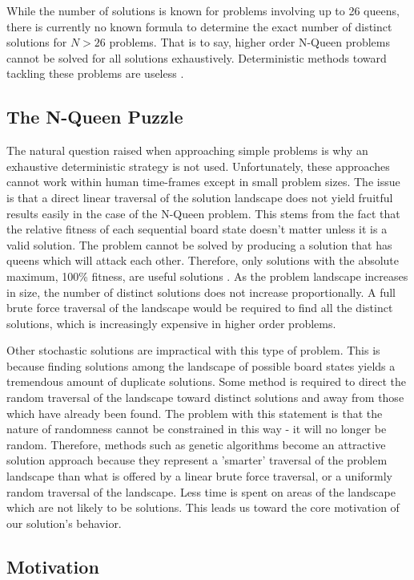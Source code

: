 \documentclass[conference]{IEEEtran}
\begin{document}
While the number of solutions is known for problems involving up to 26 queens, there is currently no known formula to determine the exact number of distinct solutions for {$N>26$} problems. That is to say, higher order N-Queen problems cannot be solved for all solutions exhaustively. Deterministic methods toward tackling these problems are useless \cite{crawford1992solving}.

\subsection{The N-Queen Puzzle}
The natural question raised when approaching simple problems is why an exhaustive deterministic strategy is not used. Unfortunately, these approaches cannot work within human time-frames except in small problem sizes. The issue is that a direct linear traversal of the solution landscape does not yield fruitful results easily in the case of the N-Queen problem. This stems from the fact that the relative fitness of each sequential board state doesn't matter unless it is a valid solution. The problem cannot be solved by producing a solution that has queens which will attack each other. Therefore, only solutions with the absolute maximum, 100\% fitness, are useful solutions \cite{crawford1992solving}. As the problem landscape increases in size, the number of distinct solutions does not increase proportionally. A full brute force traversal of the landscape would be required to find all the distinct solutions, which is increasingly expensive in higher order problems.

Other stochastic solutions are impractical with this type of problem. This is because finding solutions among the landscape of possible board states yields a tremendous amount of duplicate solutions. Some method is required to direct the random traversal of the landscape toward distinct solutions and away from those which have already been found. The problem with this statement is that the nature of randomness cannot be constrained in this way - it will no longer be random. Therefore, methods such as genetic algorithms become an attractive solution approach  because they represent a 'smarter' traversal of the problem landscape than what is offered by a linear brute force traversal, or a uniformly random traversal of the landscape\cite{srinivas1994genetic}. Less time is spent on areas of the landscape which are not likely to be solutions. This leads us toward the core motivation of our solution's behavior.

\subsection{Motivation}\label{motivation_section}
\end{document}
